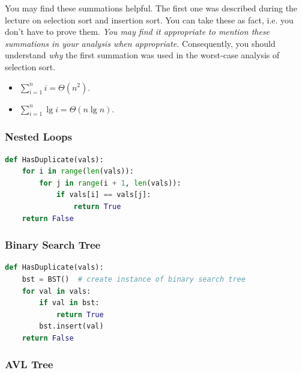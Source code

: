 \documentclass{article}
\begin{document}
You may find these summations helpful. The first one was described during the lecture on selection sort and insertion sort. You can take these as fact, i.e. you don't have to prove them. \textit{You may find it appropriate to mention these summations in your analysis when appropriate.} Consequently, you should understand \textit{why} the first summation was used in the worst-case analysis of selection sort.

\begin{itemize}
\item $\sum\limits_{i=1}^{n} i = \Theta(n^2)$.
\item $\sum\limits_{i=1}^{n} \lg i = \Theta(n \lg n)$.
\end{itemize}

\subsubsection{Nested Loops}

\begin{lstlisting}[language=Python]
def HasDuplicate(vals):
    for i in range(len(vals)):
        for j in range(i + 1, len(vals)):
            if vals[i] == vals[j]:
                return True
    return False
\end{lstlisting}

\begin{mdframed}
\vspace{3em}
\end{mdframed}

\subsubsection{Binary Search Tree}

\begin{lstlisting}[language=Python]
def HasDuplicate(vals):
    bst = BST()  # create instance of binary search tree
    for val in vals:
        if val in bst:
            return True
        bst.insert(val)
    return False
\end{lstlisting}

\begin{mdframed}
\vspace{3em}
\end{mdframed}

\subsubsection{AVL Tree}
\end{document}
